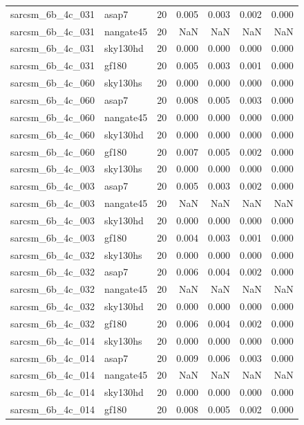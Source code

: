 \begin{tabular}{llrrrrr}
sarcsm\_6b\_4c\_031 & asap7 & 20 & 0.005 & 0.003 & 0.002 & 0.000 \\
sarcsm\_6b\_4c\_031 & nangate45 & 20 & NaN & NaN & NaN & NaN \\
sarcsm\_6b\_4c\_031 & sky130hd & 20 & 0.000 & 0.000 & 0.000 & 0.000 \\
sarcsm\_6b\_4c\_031 & gf180 & 20 & 0.005 & 0.003 & 0.001 & 0.000 \\
sarcsm\_6b\_4c\_060 & sky130hs & 20 & 0.000 & 0.000 & 0.000 & 0.000 \\
sarcsm\_6b\_4c\_060 & asap7 & 20 & 0.008 & 0.005 & 0.003 & 0.000 \\
sarcsm\_6b\_4c\_060 & nangate45 & 20 & 0.000 & 0.000 & 0.000 & 0.000 \\
sarcsm\_6b\_4c\_060 & sky130hd & 20 & 0.000 & 0.000 & 0.000 & 0.000 \\
sarcsm\_6b\_4c\_060 & gf180 & 20 & 0.007 & 0.005 & 0.002 & 0.000 \\
sarcsm\_6b\_4c\_003 & sky130hs & 20 & 0.000 & 0.000 & 0.000 & 0.000 \\
sarcsm\_6b\_4c\_003 & asap7 & 20 & 0.005 & 0.003 & 0.002 & 0.000 \\
sarcsm\_6b\_4c\_003 & nangate45 & 20 & NaN & NaN & NaN & NaN \\
sarcsm\_6b\_4c\_003 & sky130hd & 20 & 0.000 & 0.000 & 0.000 & 0.000 \\
sarcsm\_6b\_4c\_003 & gf180 & 20 & 0.004 & 0.003 & 0.001 & 0.000 \\
sarcsm\_6b\_4c\_032 & sky130hs & 20 & 0.000 & 0.000 & 0.000 & 0.000 \\
sarcsm\_6b\_4c\_032 & asap7 & 20 & 0.006 & 0.004 & 0.002 & 0.000 \\
sarcsm\_6b\_4c\_032 & nangate45 & 20 & NaN & NaN & NaN & NaN \\
sarcsm\_6b\_4c\_032 & sky130hd & 20 & 0.000 & 0.000 & 0.000 & 0.000 \\
sarcsm\_6b\_4c\_032 & gf180 & 20 & 0.006 & 0.004 & 0.002 & 0.000 \\
sarcsm\_6b\_4c\_014 & sky130hs & 20 & 0.000 & 0.000 & 0.000 & 0.000 \\
sarcsm\_6b\_4c\_014 & asap7 & 20 & 0.009 & 0.006 & 0.003 & 0.000 \\
sarcsm\_6b\_4c\_014 & nangate45 & 20 & NaN & NaN & NaN & NaN \\
sarcsm\_6b\_4c\_014 & sky130hd & 20 & 0.000 & 0.000 & 0.000 & 0.000 \\
sarcsm\_6b\_4c\_014 & gf180 & 20 & 0.008 & 0.005 & 0.002 & 0.000 \\

\end{tabular}
